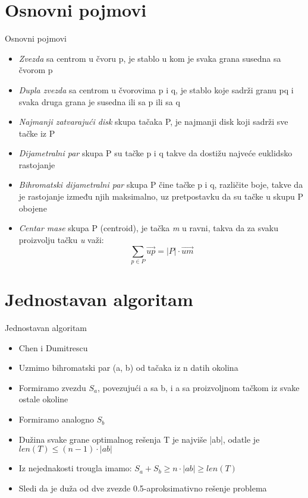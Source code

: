 \documentclass[hyperref={bookmarks=false}]{beamer}
\begin{document}
\section{Osnovni pojmovi}
\begin{frame}{Osnovni pojmovi}
\begin{itemize}
\item \textit{Zvezda} sa centrom u čvoru p, je stablo u kom je svaka grana susedna sa čvorom p
\item \textit{Dupla zvezda} sa centrom u čvorovima p i q, je stablo koje sadrži granu pq i svaka druga grana je susedna ili sa p ili sa q
\item \textit{Najmanji zatvarajući disk} skupa tačaka P, je najmanji disk koji sadrži sve tačke iz P
\item \textit{Dijametralni par} skupa P su tačke p i q takve da dostižu najveće euklidsko rastojanje
\item \textit{Bihromatski dijametralni par} skupa P čine tačke p i q, različite boje, takve da je rastojanje između njih maksimalno, uz pretpostavku da su tačke u skupu P obojene
\item \textit{Centar mase} skupa P (centroid), je tačka \textit{m} u ravni, takva da za svaku proizvolju tačku \textit{u} važi: 
\[
\sum_{p \in P} \overrightarrow{up} = |P| \cdot \overrightarrow{um}
\]
\end{itemize}
\end{frame}

\section{Jednostavan algoritam}
\begin{frame}{Jednostavan algoritam}
\begin{itemize}
\item Chen i Dumitrescu
\item Uzmimo bihromatski par (a, b) od tačaka iz n datih okolina
\item Formiramo zvezdu $S_a$, povezujući a sa b, i a sa proizvoljnom tačkom iz svake ostale okoline
\item Formiramo analogno $S_b$
\item Dužina svake grane optimalnog rešenja T je najviše |ab|, odatle je $len(T) \leq (n-1)\cdot|ab|$
\item Iz nejednakosti trougla imamo: $S_a + S_b \ge n\cdot|ab| \ge len(T)$
\item Sledi da je duža od dve zvezde 0.5-aproksimativno rešenje problema
\end{itemize}    
\end{frame}
\end{document}
